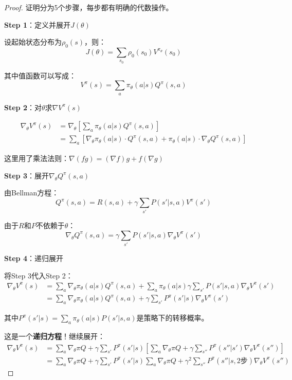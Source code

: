 \documentclass[11pt,a4paper]{article}
\theoremstyle{definition}
\begin{document}
\begin{proof}
证明分为5个步骤，每步都有明确的代数操作。

\textbf{Step 1}：定义并展开$J(\theta)$

设起始状态分布为$\rho_0(s)$，则：
\[
J(\theta) = \sum_{s_0} \rho_0(s_0) V^{\pi_\theta}(s_0)
\]

其中值函数可以写成：
\[
V^\pi(s) = \sum_a \pi_\theta(a|s) Q^\pi(s,a)
\]

\textbf{Step 2}：对$\theta$求$\nabla V^\pi(s)$

\begin{align*}
\nabla_\theta V^{\pi}(s) &= \nabla_\theta \left[\sum_a \pi_\theta(a|s) Q^\pi(s,a)\right] \\
&= \sum_a \left[\nabla_\theta \pi_\theta(a|s) \cdot Q^\pi(s,a) + \pi_\theta(a|s) \cdot \nabla_\theta Q^\pi(s,a)\right]
\end{align*}

这里用了乘法法则：$\nabla(fg) = (\nabla f)g + f(\nabla g)$

\textbf{Step 3}：展开$\nabla_\theta Q^\pi(s,a)$

由Bellman方程：
\[
Q^\pi(s,a) = R(s,a) + \gamma \sum_{s'} P(s'|s,a) V^\pi(s')
\]

由于$R$和$P$不依赖于$\theta$：
\[
\nabla_\theta Q^\pi(s,a) = \gamma \sum_{s'} P(s'|s,a) \nabla_\theta V^\pi(s')
\]

\textbf{Step 4}：递归展开

将Step 3代入Step 2：
\begin{align*}
\nabla_\theta V^{\pi}(s) &= \sum_a \nabla_\theta \pi_\theta(a|s) Q^\pi(s,a) + \sum_a \pi_\theta(a|s) \gamma \sum_{s'} P(s'|s,a) \nabla_\theta V^\pi(s') \\
&= \sum_a \nabla_\theta \pi_\theta(a|s) Q^\pi(s,a) + \gamma \sum_{s'} P^\pi(s'|s) \nabla_\theta V^\pi(s')
\end{align*}

其中$P^\pi(s'|s) = \sum_a \pi_\theta(a|s) P(s'|s,a)$是策略下的转移概率。

这是一个\textbf{递归方程}！继续展开：
\begin{align*}
\nabla_\theta V^\pi(s) &= \sum_a \nabla_\theta \pi Q + \gamma \sum_{s'} P^\pi(s'|s) \left[\sum_a \nabla_\theta \pi Q + \gamma \sum_{s''} P^\pi(s''|s') \nabla_\theta V^\pi(s'')\right] \\
&= \sum_a \nabla_\theta \pi Q + \gamma \sum_{s'} P^\pi(s'|s) \sum_a \nabla_\theta \pi Q + \gamma^2 \sum_{s''} P^\pi(s''|s, 2\text{步}) \nabla_\theta V^\pi(s'')
\end{align*}


\end{proof}
\end{document}
